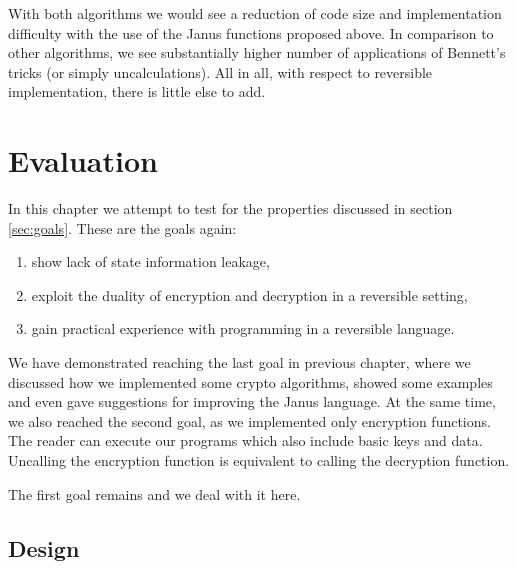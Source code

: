 \documentclass[a4paper,10pt,openright]{memoir}
\begin{document}
With both algorithms we would see a reduction of code size and 
implementation difficulty with the use of the Janus functions proposed 
above. In comparison to other algorithms, we see substantially higher 
number of applications of Bennett's tricks (or simply uncalculations). 
All in all, with respect to reversible implementation, there is little 
else to add. 


\chapter{Evaluation}
\label{sec:eval}

In this chapter we attempt to test for the properties discussed in 
section \ref{sec:goals}. These are the goals again:

\begin{enumerate}
\item show lack of state information leakage,
\item exploit the duality of encryption and decryption in a reversible setting,
\item gain practical experience with programming in a reversible language.
\end{enumerate}

We have demonstrated reaching the last goal in previous chapter, where 
we discussed how we implemented some crypto algorithms, showed some 
examples and even gave suggestions for improving the Janus language. At 
the same time, we also reached the second goal, as we implemented only 
encryption functions. The reader can execute our programs which also 
include basic keys and data. Uncalling the encryption function is 
equivalent to calling the decryption function.

The first goal remains and we deal with it here.

\section{Design}
\label{sec:eval:design}
\end{document}
